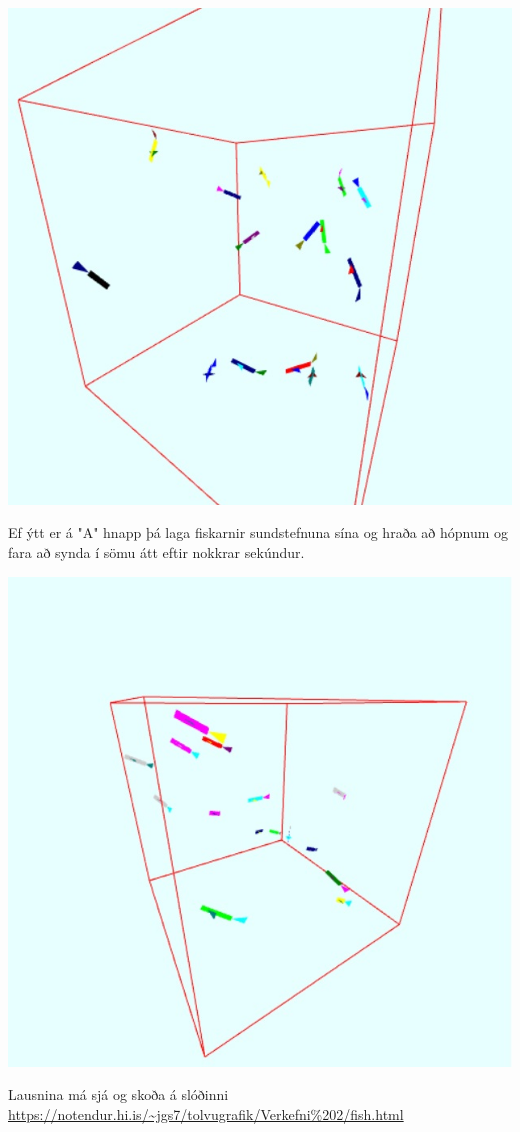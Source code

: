 \documentclass[12pt]{article}
\begin{document}
\begin{small}
\begin{center}
\includegraphics[scale=0.5]{2}
\end{center}
Ef ýtt er á "A" hnapp þá laga fiskarnir sundstefnuna sína og hraða að hópnum og fara að synda í sömu átt eftir nokkrar sekúndur.
\begin{center}
\includegraphics[scale=0.5]{3}
\end{center}
Lausnina má sjá og skoða á slóðinni
 \url{https://notendur.hi.is/~jgs7/tolvugrafik/Verkefni%202/fish.html}
\end{small}
\end{document}

